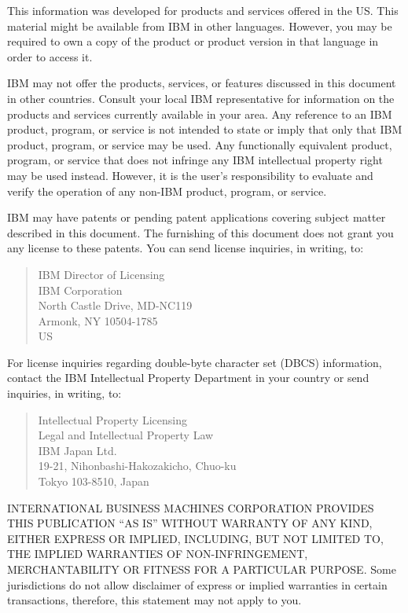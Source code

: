 
This information was developed for products and services offered in the
US\@.  This material might be available from IBM in other languages.
However, you may be required to own a copy of the product or product
version in that language in order to access it.

IBM may not offer the products, services, or features discussed in this
document in other countries.  Consult your local IBM representative for
information on the products and services currently available in your area.
Any reference to an IBM product, program, or service is not intended to
state or imply that only that IBM product, program, or service may be
used.  Any functionally equivalent product, program, or service that does
not infringe any IBM intellectual property right may be used instead.
However, it is the user's responsibility to evaluate and verify the
operation of any non-IBM product, program, or service.

IBM may have patents or pending patent applications covering subject
matter described in this document.  The furnishing of this document does
not grant you any license to these patents.  You can send license
inquiries, in writing, to:
\begin{quote}
  IBM Director of Licensing\\
  IBM Corporation\\
  North Castle Drive, MD-NC119\\
  Armonk, NY 10504-1785\\
  US
\end{quote}

For license inquiries regarding double-byte character set (DBCS)
information, contact the IBM Intellectual Property Department in your
country or send inquiries, in writing, to:
\begin{quote}
  Intellectual Property Licensing\\
  Legal and Intellectual Property Law\\
  IBM Japan Ltd.\\
  19-21, Nihonbashi-Hakozakicho, Chuo-ku\\
  Tokyo 103-8510, Japan
\end{quote}

INTERNATIONAL BUSINESS MACHINES CORPORATION PROVIDES THIS PUBLICATION ``AS
IS'' WITHOUT WARRANTY OF ANY KIND, EITHER EXPRESS OR IMPLIED, INCLUDING,
BUT NOT LIMITED TO, THE IMPLIED WARRANTIES OF NON-INFRINGEMENT,
MERCHANTABILITY OR FITNESS FOR A PARTICULAR PURPOSE\@.  Some jurisdictions
do not allow disclaimer of express or implied warranties in certain
transactions, therefore, this statement may not apply to you.

